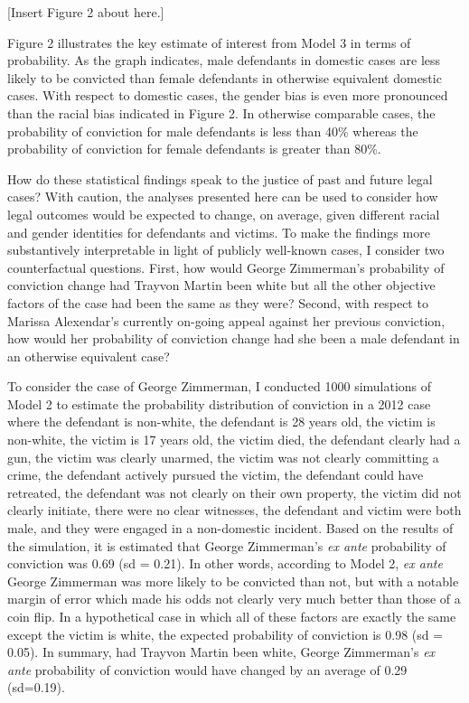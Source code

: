 \documentclass[12pt,article]{article}
\begin{document}
\begin{center}[Insert Figure 2 about here.]\end{center}

Figure 2 illustrates the key estimate of interest from Model 3 in terms
of probability. As the graph indicates, male defendants in domestic
cases are less likely to be convicted than female
defendants in otherwise equivalent domestic cases. With respect to
domestic cases, the gender bias is even more pronounced than the racial
bias indicated in Figure 2. In otherwise comparable cases, the
probability of conviction for male defendants is less than 40\% whereas
the probability of conviction for female defendants is greater than
80\%.

How do these statistical findings speak to the justice of past and
future legal cases? With caution, the analyses presented here can be
used to consider how legal outcomes would be expected to change, on
average, given different racial and gender identities for defendants and
victims. To make the findings more substantively interpretable in light
of publicly well-known cases, I consider two counterfactual questions.
First, how would George Zimmerman's probability of conviction change had
Trayvon Martin been white but all the other objective factors of
the case had been the same as they were? Second, with respect to Marissa
Alexendar's currently on-going appeal against her previous conviction,
how would her probability of conviction change had she been a male
defendant in an otherwise equivalent case?

To consider the case of George Zimmerman, I conducted 1000 simulations
of Model 2 to estimate the probability distribution of conviction in a
2012 case where the defendant is non-white, the defendant is 28 years
old, the victim is non-white, the victim is 17 years old, the victim
died, the defendant clearly had a gun, the victim was clearly unarmed,
the victim was not clearly committing a crime, the defendant actively
pursued the victim, the defendant could have retreated, the defendant
was not clearly on their own property, the victim did not clearly
initiate, there were no clear witnesses, the defendant and victim were
both male, and they were engaged in a non-domestic incident. Based on
the results of the simulation, it is estimated that George Zimmerman's
\emph{ex ante} probability of conviction was 0.69 (sd = 0.21). In other
words, according to Model 2, \emph{ex ante} George Zimmerman was more
likely to be convicted than not, but with a notable margin of error
which made his odds not clearly very much better than those of a coin
flip. In a hypothetical case in which all of these factors are exactly
the same except the victim is white, the expected probability of
conviction is 0.98 (sd = 0.05). In summary, had Trayvon Martin been
white, George Zimmerman's \emph{ex ante} probability of conviction would
have changed by an average of 0.29 (sd=0.19).
\end{document}
